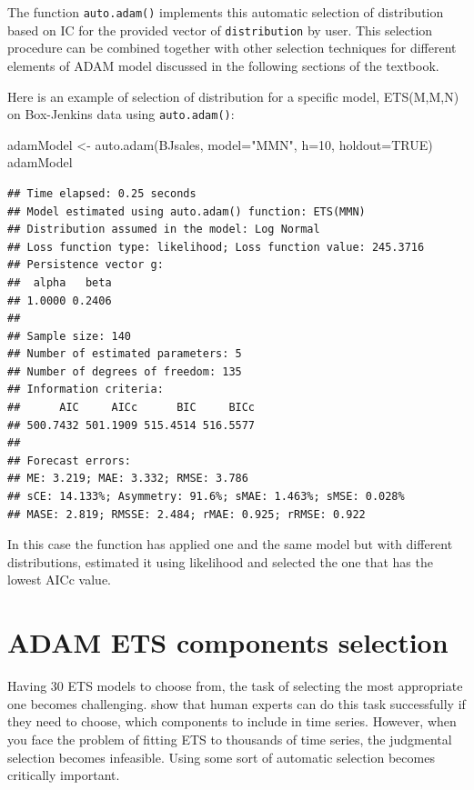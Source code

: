 \documentclass[
]{book}
\newenvironment{Shaded}{\begin{snugshade}}{\end{snugshade}}
\newcommand{\AttributeTok}[1]{\textcolor[rgb]{0.77,0.63,0.00}{#1}}
\newcommand{\ConstantTok}[1]{\textcolor[rgb]{0.00,0.00,0.00}{#1}}
\newcommand{\DecValTok}[1]{\textcolor[rgb]{0.00,0.00,0.81}{#1}}
\newcommand{\FunctionTok}[1]{\textcolor[rgb]{0.00,0.00,0.00}{#1}}
\newcommand{\NormalTok}[1]{#1}
\newcommand{\OtherTok}[1]{\textcolor[rgb]{0.56,0.35,0.01}{#1}}
\newcommand{\StringTok}[1]{\textcolor[rgb]{0.31,0.60,0.02}{#1}}
\theoremstyle{definition}
\theoremstyle{definition}
\theoremstyle{definition}
\theoremstyle{definition}
\theoremstyle{remark}
\begin{document}
The function \texttt{auto.adam()} implements this automatic selection of distribution based on IC for the provided vector of \texttt{distribution} by user. This selection procedure can be combined together with other selection techniques for different elements of ADAM model discussed in the following sections of the textbook.

Here is an example of selection of distribution for a specific model, ETS(M,M,N) on Box-Jenkins data using \texttt{auto.adam()}:

\begin{Shaded}
\begin{Highlighting}[]
\NormalTok{adamModel }\OtherTok{\textless{}{-}} \FunctionTok{auto.adam}\NormalTok{(BJsales, }\AttributeTok{model=}\StringTok{"MMN"}\NormalTok{, }\AttributeTok{h=}\DecValTok{10}\NormalTok{, }\AttributeTok{holdout=}\ConstantTok{TRUE}\NormalTok{)}
\NormalTok{adamModel}
\end{Highlighting}
\end{Shaded}

\begin{verbatim}
## Time elapsed: 0.25 seconds
## Model estimated using auto.adam() function: ETS(MMN)
## Distribution assumed in the model: Log Normal
## Loss function type: likelihood; Loss function value: 245.3716
## Persistence vector g:
##  alpha   beta 
## 1.0000 0.2406 
## 
## Sample size: 140
## Number of estimated parameters: 5
## Number of degrees of freedom: 135
## Information criteria:
##      AIC     AICc      BIC     BICc 
## 500.7432 501.1909 515.4514 516.5577 
## 
## Forecast errors:
## ME: 3.219; MAE: 3.332; RMSE: 3.786
## sCE: 14.133%; Asymmetry: 91.6%; sMAE: 1.463%; sMSE: 0.028%
## MASE: 2.819; RMSSE: 2.484; rMAE: 0.925; rRMSE: 0.922
\end{verbatim}

In this case the function has applied one and the same model but with different distributions, estimated it using likelihood and selected the one that has the lowest AICc value.

\hypertarget{ETSSelection}{%
\section{ADAM ETS components selection}\label{ETSSelection}}

Having 30 ETS models to choose from, the task of selecting the most appropriate one becomes challenging. \citet{Petropoulos2018a} show that human experts can do this task successfully if they need to choose, which components to include in time series. However, when you face the problem of fitting ETS to thousands of time series, the judgmental selection becomes infeasible. Using some sort of automatic selection becomes critically important.
\end{document}

